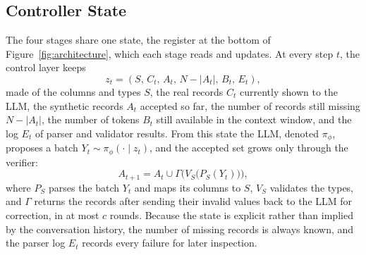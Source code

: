 \documentclass[conference]{IEEEtran}
\begin{document}
\subsection{Controller State}
The four stages share one state, the register at the bottom of Figure~\ref{fig:architecture}, which each stage reads and updates. At every step $t$, the control layer keeps
\begin{equation}
z_t=(S,\,C_t,\,A_t,\,N-|A_t|,\,B_t,\,E_t),
\label{eq:state}
\end{equation}
made of the columns and types $S$, the real records $C_t$ currently shown to the LLM, the synthetic records $A_t$ accepted so far, the number of records still missing $N-|A_t|$, the number of tokens $B_t$ still available in the context window, and the log $E_t$ of parser and validator results. From this state the LLM, denoted $\pi_{\phi}$, proposes a batch $Y_t\sim\pi_{\phi}(\cdot\mid z_t)$, and the accepted set grows only through the verifier:
\begin{equation}
A_{t+1}=A_t\cup \Gamma\bigl(V_S\bigl(P_S(Y_t)\bigr)\bigr),
\label{eq:acceptance}
\end{equation}
where $P_S$ parses the batch $Y_t$ and maps its columns to $S$, $V_S$ validates the types, and $\Gamma$ returns the records after sending their invalid values back to the LLM for correction, in at most $c$ rounds. Because the state is explicit rather than implied by the conversation history, the number of missing records is always known, and the parser log $E_t$ records every failure for later inspection.
\end{document}
